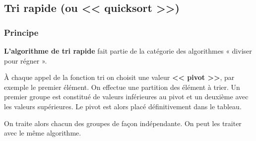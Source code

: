 \subsection{Tri rapide (ou << quicksort >>)}

\subsubsection{Principe}

\begin{defi}
\textbf{L'algorithme de tri rapide} fait partie de la catégorie des algorithmes « diviser pour régner ».

À chaque appel de la fonction tri on choisit une valeur \textbf{<< pivot >>}, par exemple le premier élément. On effectue une partition des élément à trier. Un premier groupe est constitué de valeurs inférieures au pivot  et un deuxième avec les valeurs supérieures.
Le pivot est alors placé définitivement dans le tableau.

On traite alors chacun des groupes de façon indépendante. On peut les traiter avec le même algorithme.
\end{defi}

